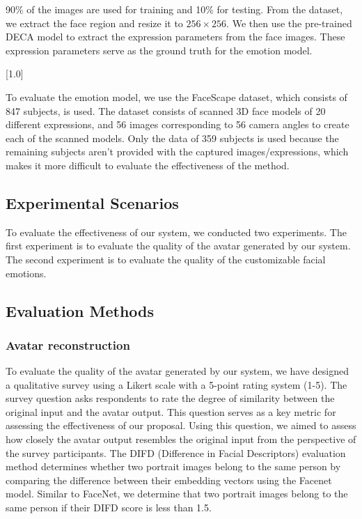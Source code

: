 90\% of the images are used for training and 10\% for testing. From the dataset, we extract the face region and resize it to $256\times256$. We then use the pre-trained DECA model to extract the expression parameters from the face images. These expression parameters serve as the ground truth for the emotion model.

[1.0]

To evaluate the emotion model, we use the FaceScape dataset, which consists of 847 subjects, is used. The dataset consists of scanned 3D face models of 20 different expressions, and 56 images corresponding to 56 camera angles to create each of the scanned models. Only the data of 359 subjects is used because the remaining subjects aren't provided with the captured images/expressions, which makes it more difficult to evaluate the effectiveness of the method.

\subsection{Experimental Scenarios}
To evaluate the effectiveness of our system, we conducted two experiments. The first experiment is to evaluate the quality of the avatar generated by our system. The second experiment is to evaluate the quality of the customizable facial emotions.


\subsection{Evaluation Methods}
\subsubsection{Avatar reconstruction}
To evaluate the quality of the avatar generated by our system, we have designed a qualitative survey using a Likert scale with a 5-point rating system (1-5). The survey question asks respondents to rate the degree of similarity between the original input and the avatar output. This question serves as a key metric for assessing the effectiveness of our proposal.
Using this question, we aimed to assess how closely the avatar output resembles the original input from the perspective of the survey participants.
The DIFD (Difference in Facial Descriptors) evaluation method determines whether two portrait images belong to the same person by comparing the difference between their embedding vectors using the Facenet model. Similar to FaceNet, we determine that two portrait images belong to the same person if their DIFD score is less than 1.5.

